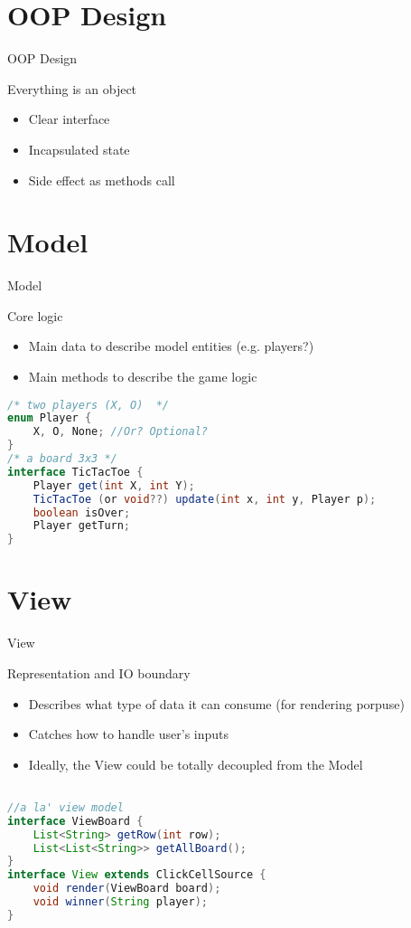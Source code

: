 \documentclass[presentation]{beamer}
\begin{document}
\section{OOP Design}
\begin{frame}[fragile]{OOP Design}
\begin{block}{Everything is an object}
  \begin{itemize}
  \item Clear interface
  \item Incapsulated state
  \item Side effect as methods call
  \end{itemize}
\end{block}

\end{frame}

\section{Model}
\begin{frame}[fragile]{Model}
\begin{block}{Core logic}
  \begin{itemize}
    \item Main data to describe model entities (e.g. players?)
    \item Main methods to describe the game logic
  \end{itemize}
\end{block}
\begin{lstlisting}[language=Java]
/* two players (X, O)  */
enum Player {
    X, O, None; //Or? Optional?
}
/* a board 3x3 */
interface TicTacToe {
    Player get(int X, int Y);
    TicTacToe (or void??) update(int x, int y, Player p);
    boolean isOver;
    Player getTurn;
}
\end{lstlisting}
\end{frame}

\section{View}
\begin{frame}[fragile]{View}
\begin{block}{Representation and IO boundary}
  \begin{itemize}
    \item Describes what type of data it can consume (for rendering porpuse)
    \item Catches how to handle user's inputs
    \item Ideally, the View could be totally decoupled from the Model
  \end{itemize}
\end{block}
\begin{lstlisting}[language=Java]

//a la' view model
interface ViewBoard {
    List<String> getRow(int row);
    List<List<String>> getAllBoard();
}
interface View extends ClickCellSource {
    void render(ViewBoard board);
    void winner(String player);
}
\end{lstlisting}
\end{frame}
\end{document}
